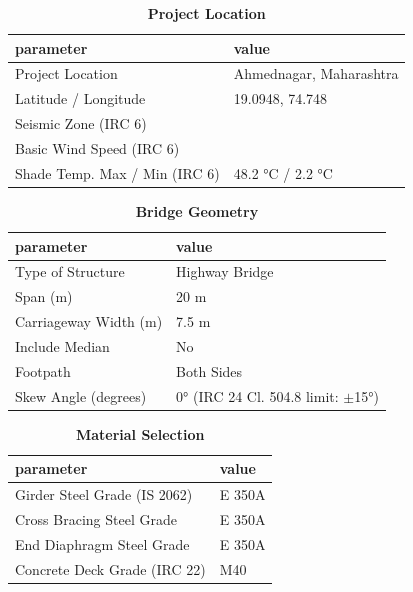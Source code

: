 \documentclass[12pt,a4paper]{report}
\numberwithin{table}{chapter}
\numberwithin{figure}{chapter}
\begin{document}
\begin{table}[H]
\caption{\textbf{Project Location}}
\label{subsec:project-location}
\begin{tabular}{|L{5.5cm}|L{8.5cm}|}
\hline
\textbf{parameter} & \textbf{value} \\
\hline
\textnormal{Project Location} & Ahmednagar, Maharashtra \\
\hline
\textnormal{Latitude / Longitude} & 19.0948, 74.748 \\
\hline
\textnormal{Seismic Zone (IRC 6)} &  \\
\hline
\textnormal{Basic Wind Speed (IRC 6)} &  \\
\hline
\textnormal{Shade Temp. Max / Min (IRC 6)} & 48.2 °C / 2.2 °C \\
\hline
\end{tabular}
\vspace{0.4cm}
\end{table}

\begin{table}[H]
\caption{\textbf{Bridge Geometry}}
\label{subsec:bridge-geometry}
\begin{tabular}{|L{5.5cm}|L{8.5cm}|}
\hline
\textbf{parameter} & \textbf{value} \\
\hline
\textnormal{Type of Structure} & Highway Bridge \\
\hline
\textnormal{Span (m)} & 20 m \\
\hline
\textnormal{Carriageway Width (m)} & 7.5 m \\
\hline
\textnormal{Include Median} & No \\
\hline
\textnormal{Footpath} & Both Sides \\
\hline
\textnormal{Skew Angle (degrees)} & 0° (IRC 24 Cl. 504.8 limit: $\pm$15°) \\
\hline
\end{tabular}
\end{table}
\vspace{0.4cm}

\begin{table}[H]
\caption{\textbf{Material Selection}}
\label{subsec:material}
\begin{tabular}{|L{5.5cm}|L{8.5cm}|}
\hline
\textbf{parameter} & \textbf{value} \\
\hline
\textnormal{Girder Steel Grade (IS 2062)} & E 350A \\
\hline
\textnormal{Cross Bracing Steel Grade} & E 350A \\
\hline
\textnormal{End Diaphragm Steel Grade} & E 350A \\
\hline
\textnormal{Concrete Deck Grade (IRC 22)} & M40 \\
\hline
\end{tabular}
\end{table}
\vspace{0.4cm}
\end{document}
